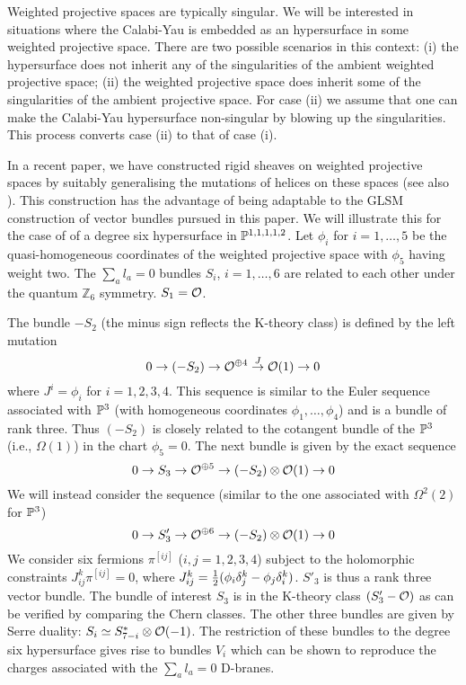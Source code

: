 \documentclass[a4paper,12pt]{article}
\def\Bbb{\mathbb}
\def\BZ{\Bbb Z} \def\BR{\Bbb R}
\begin{document}
Weighted projective spaces are typically singular. We will be interested
in situations where the Calabi-Yau is embedded as an hypersurface in
some weighted projective space. There are two possible scenarios in this
context: (i) the hypersurface does not inherit any of the singularities of 
the ambient weighted projective space; (ii) the weighted projective
space does inherit some of the singularities of the ambient projective
space. For case (ii) we assume that one can make the Calabi-Yau hypersurface
non-singular by blowing up the singularities. This process converts
case (ii) to that of case (i).

In a recent paper\cite{helices}, we have constructed  rigid sheaves
on weighted projective spaces by suitably generalising the mutations of
helices on these spaces (see also \cite{mayrtomas}). 
This construction has the advantage of 
being adaptable to the GLSM construction of vector bundles pursued in
this paper. We will illustrate this for the case of of a degree
six hypersurface in $\BP^{1,1,1,1,2}$. Let $\phi_i$ for $i=1,\ldots,5$
be the quasi-homogeneous coordinates of the weighted projective space
with $\phi_5$ having weight two.
The $\sum_a l_a=0$ bundles
$S_i$, $i=1,\ldots,6$ are related to each other under the quantum
$\BZ_6$ symmetry. $S_1={\cal O}$.

The bundle $-S_2$ (the minus sign reflects the K-theory class)
is defined by the left mutation
\begin{equation}
0\rightarrow (-S_2) \rightarrow  {\cal O}^{\oplus 4}
\stackrel{J}{\rightarrow} {\cal O}(1) \rightarrow 0
\end{equation}
where $J^i=\phi_i$ for $i=1,2,3,4$. This sequence is similar to the
Euler sequence associated with $\BP^3$ (with homogeneous coordinates
$\phi_1,\ldots,\phi_4$) and is a bundle of rank three. Thus $(-S_2)$
is closely related to the cotangent bundle of the $\BP^3$ (i.e.,
$\Omega(1)$) in the chart $\phi_5=0$.
The next bundle is given by the exact sequence
\begin{equation}
0\rightarrow S_3
\rightarrow {\cal O}^{\oplus 5}\rightarrow
(-S_2)\otimes{\cal O}(1)\rightarrow 0
\end{equation}
We will instead consider the sequence (similar to the one associated
with $\Omega^2(2)$ for $\BP^3$)
\begin{equation}
0\rightarrow S'_3 \rightarrow {\cal O}^{\oplus 6} \rightarrow 
(-S_2)\otimes{\cal O}(1)\rightarrow 0
\end{equation}
We consider six fermions $\pi^{[ij]}$ ($i,j=1,2,3,4$) subject to
the holomorphic constraints $J^k_{ij} \pi^{[ij]}=0$, 
where $J^k_{ij}= {1\over2}(\phi_i \delta_j^k - \phi_j\delta_i^k)$.
$S'_3$ is thus a rank three vector bundle.
The bundle of interest $S_3$ is in the K-theory class $(S'_3-{\cal O})$
as can be verified by comparing the Chern classes\cite{helices}.
The other three bundles are given by Serre duality:
$S_i \simeq S_{7-i}^\ast \otimes {\cal O}(-1)$.  The  restriction of
these bundles to the degree six hypersurface gives rise to bundles
$V_i$ which can be shown to reproduce the charges associated with
the $\sum_a l_a=0$ D-branes\cite{helices}.
\end{document}
